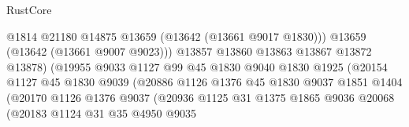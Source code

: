 \begin{lexlean}{RustCore}
\begin{coremodule}
                                            @1814
                                            @21180
                                            @14875
                                            @13659
                                            (@13642 (@13661 @9017 @1830)))
                                          @13659
                                          (@13642 (@13661 @9007 @9023)))
                                        @13857
                                        @13860
                                        @13863
                                        @13867
                                        @13872
                                        @13878)
                                      (@19955
                                        @9033
                                        @1127
                                        @99
                                        @45
                                        @1830
                                        @9040
                                        @1830
                                        @1925
                                        (@20154
                                          @1127
                                          @45
                                          @1830
                                          @9039
                                          (@20886
                                            @1126
                                            @1376
                                            @45
                                            @1830
                                            @9037
                                            @1851
                                            @1404
                                            (@20170
                                              @1126
                                              @1376
                                              @9037
                                              (@20936
                                                @1125
                                                @31
                                                @1375
                                                @1865
                                                @9036
                                                @20068
                                                (@20183
                                                  @1124
                                                  @31
                                                  @35
                                                  @4950
                                                  @9035

\end{coremodule}
\end{lexlean}
